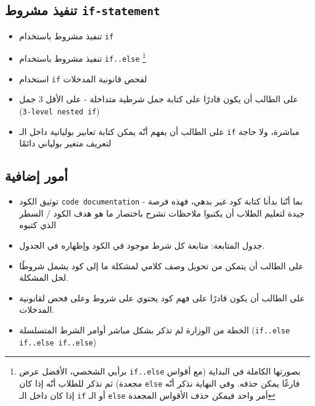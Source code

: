 ﻿\documentclass[14pt]{extarticle}
\begin{document}
\subsection{تنفيذ مشروط \texttt{if-statement}}
\begin{itemize}
    \item تنفيذ مشروط باستخدام \texttt{if}
    \item تنفيذ مشروط باستخدام \texttt{if..else}
    \footnote{برأيي الشخصي، الأفضل عرض \texttt{if..else} بصورتها الكاملة في البداية (مع أقواس مجعدة)
     ثم نذكر للطلاب أنّه إذا كان \texttt{else} فارغًا يمكن حذفه.
     وفي النهاية نذكر أنّه إذا كان داخل الـ \texttt{if} أو الـ \texttt{else} أمر واحد فيمكن حذف الأقواس المجعدة}
     \item استخدام \texttt{if} لفحص قانونية المدخلات
     \item على الطالب أن يكون قادرًا على كتابة جمل شرطية متداخلة - على الأقل 3 جمل (\texttt{3-level nested if})
     \item على الطالب أن يفهم أنّه يمكن كتابة تعابير بوليانية داخل الـ \texttt{if} مباشرة، ولا حاجة لتعريف متغير بولياني دائمًا
\end{itemize}

\subsection{أمور إضافية}
\begin{itemize}
    \item توثيق الكود \texttt{code documentation} - بما أنّنا بدأنا كتابة كود غير بدهي، فهذه فرصة جيدة
    لتعليم الطلاب أن يكتبوا ملاحظات تشرح باختصار ما هو هدف الكود / السطر الذي كتبوه
    \item جدول المتابعة: متابعة كل شرط موجود في الكود وإظهاره في الجدول.
    \item على الطالب أن يتمكن من تحويل وصف كلامي لمشكلة ما إلى كود يشمل شروطًا لحل المشكلة.
    \item على الطالب أن يكون قادرًا على فهم كود يحتوي على شروط وعلى فحص لقانونية المدخلات.
    \item الخطة من الوزارة لم تذكر بشكل مباشر أوامر الشرط المتسلسلة (\texttt{if..else if..else if..else})
\end{itemize}

\clearpage
\end{document}

